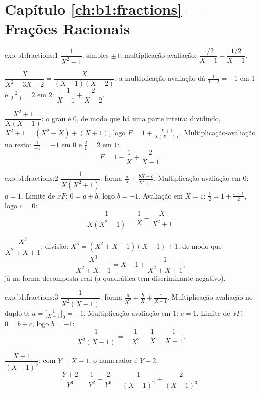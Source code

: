 \section*{Capítulo \ref{ch:b1:fractions} --- Frações Racionais}

\begin{solution}{exo:b1:fractions:1}
$\dfrac{1}{X^2 - 1}$:  simples $\pm 1$; multiplicação-avaliação:
$\dfrac{1/2}{X-1} - \dfrac{1/2}{X+1}$.

$\dfrac{X}{X^2 - 3X + 2} = \dfrac{X}{(X-1)(X-2)}$: a multiplicação-avaliação dá
$\frac{1}{1-2} = -1$ em $1$ e $\frac{2}{2-1} = 2$ em $2$:
$\dfrac{-1}{X-1} + \dfrac{2}{X-2}$.

$\dfrac{X^2+1}{X(X-1)}$: o grau é $0$, de modo que há uma parte
inteira: dividindo, $X^2 + 1 = (X^2 - X) + (X + 1)$, logo $F = 1 +
\frac{X+1}{X(X-1)}$. Multiplicação-avaliação no resto: $\frac{1}{-1} = -1$
em $0$ e $\frac{2}{1} = 2$ em $1$:
\[
F = 1 - \frac{1}{X} + \frac{2}{X-1} .
\]
\end{solution}

\begin{solution}{exo:b1:fractions:2}
$\dfrac{1}{X(X^2+1)}$: forma $\frac aX + \frac{bX + c}{X^2 + 1}$.
Multiplicação-avaliação em $0$: $a = 1$. Limite de $xF$: $0 = a + b$, logo $b = -1$.
Avaliação em $X = 1$: $\frac12 = 1 + \frac{c - 1}{2}$, logo $c = 0$:
\[
\frac{1}{X(X^2+1)} = \frac 1X - \frac{X}{X^2+1} .
\]

$\dfrac{X^3}{X^2+X+1}$: divisão: $X^3 = (X^2+X+1)(X - 1) + 1$, de modo que
\[
\frac{X^3}{X^2+X+1} = X - 1 + \frac{1}{X^2 + X + 1} ,
\]
já na forma decomposta real (a quadrática tem discriminante
negativo).
\end{solution}

\begin{solution}{exo:b1:fractions:3}
$\dfrac{1}{X^2(X-1)}$: forma $\frac{a}{X^2} + \frac bX +
\frac{c}{X-1}$. Multiplicação-avaliação no  duplo $0$:
$a = \bigl[\frac{1}{X-1}\bigr]_{0} = -1$. Multiplicação-avaliação em $1$: $c = 1$.
Limite de $xF$: $0 = b + c$, logo $b = -1$:
\[
\frac{1}{X^2(X-1)} = -\frac{1}{X^2} - \frac1X + \frac{1}{X-1} .
\]

$\dfrac{X+1}{(X-1)^3}$: com $Y = X - 1$, o numerador é $Y + 2$:
\[
\frac{Y + 2}{Y^3} = \frac{1}{Y^2} + \frac{2}{Y^3}
= \frac{1}{(X-1)^2} + \frac{2}{(X-1)^3} .
\]
\end{solution}

